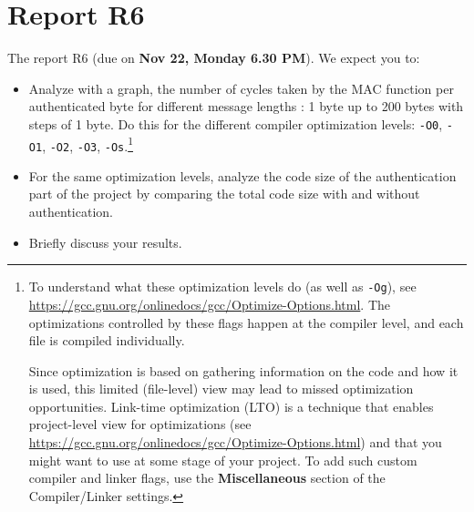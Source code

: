 \section{Report R6}

The report R6 (due on \textbf{Nov 22, Monday 6.30 PM}). We expect you to:
\begin{itemize}
    \item Analyze with a graph, the number of cycles taken by the MAC function
        per authenticated byte for different message lengths : 1 byte up to 200
        bytes with steps of 1 byte. Do this for the different compiler
        optimization levels:
        \texttt{-O0},
        \texttt{-O1},
        \texttt{-O2},
        \texttt{-O3},
        \texttt{-Os}.\footnote{%
            To understand what these optimization levels do (as well as
            \texttt{-Og}), see
            \url{https://gcc.gnu.org/onlinedocs/gcc/Optimize-Options.html}.
            The optimizations controlled by these flags happen at the compiler
            level, and each file is compiled individually.

            Since optimization is based on gathering information on the
            code and how it is used, this limited (file-level) view may lead to
            missed optimization opportunities.
            Link-time optimization (LTO) is a technique that enables
            project-level view for optimizations (see
            \url{https://gcc.gnu.org/onlinedocs/gcc/Optimize-Options.html})
            and that you might want to use at some stage of your project.
            To add such custom compiler and linker flags, use the
            \textbf{Miscellaneous} section of the Compiler/Linker settings.
        }
    \item For the same optimization levels, analyze the code size of the
        authentication part of the project by comparing the total code size with
        and without authentication.
    \item Briefly discuss your results.
\end{itemize}
